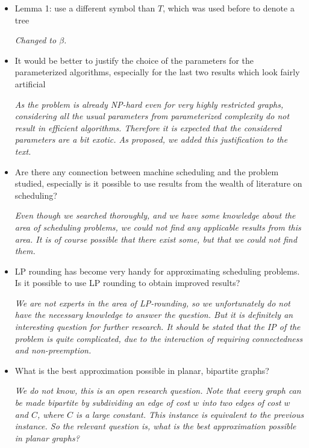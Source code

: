 \documentclass[11pt,a4paper]{article}
\begin{document}
\begin{itemize}
\item Lemma 1: use a different symbol than $T$, which was used before to denote a tree

\textit{Changed to $\beta$.}

\item It would be better to justify the choice of the parameters for the parameterized algorithms, especially for the last two results which look fairly artificial

\textit{As the problem is already NP-hard even for very highly restricted graphs, considering all the usual parameters from parameterized complexity do not result in efficient algorithms. Therefore it is expected that the considered parameters are a bit exotic. As proposed, we added this justification to the text.}

\item Are there any connection between machine scheduling and the problem studied, especially is it possible to use results from the wealth of literature on scheduling?

\textit{Even though we searched thoroughly, and we have some knowledge about the area of scheduling problems, we could not find any applicable results from this area. It is of course possible that there exist some, but that we could not find them.}

\item LP rounding has become very handy for approximating scheduling problems. Is it possible to use LP rounding to obtain improved results?

\textit{We are not experts in the area of LP-rounding, so we unfortunately do not have the necessary knowledge to answer the question. But it is definitely an interesting question for further research. It should be stated that the IP of the problem is quite complicated, due to the interaction of requiring connectedness and non-preemption.}

\item What is the best approximation possible in planar, bipartite graphs? 

\textit{We do not know, this is an open research question. Note that every graph can be made bipartite by subdividing an edge of cost $w$ into two edges of cost $w$ and $C$, where $C$ is a large constant. This instance is equivalent to the previous instance. So the relevant question is, what is the best approximation possible in planar graphs? }

\end{itemize}
\end{document}
